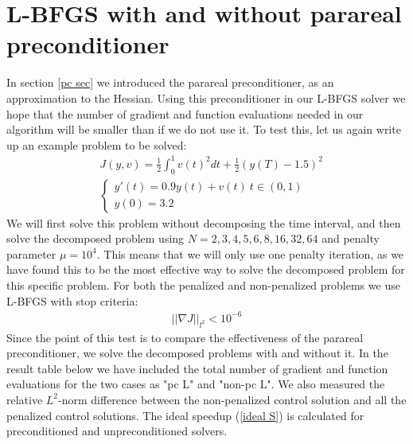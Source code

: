 \section{L-BFGS with and without parareal preconditioner}
In section \ref{pc sec} we introduced the parareal preconditioner, as an approximation to the Hessian. Using this preconditioner in our L-BFGS solver we hope that the number of gradient and function evaluations needed in our algorithm will be smaller than if we do not use it. To test this, let us again write up an example problem to be solved:
\begin{align*}
&J(y,v) = \frac{1}{2}\int_0^1v(t)^2dt + \frac{1}{2}(y(T)-1.5)^2 \\
&\left\{
     \begin{array}{lr}
       	y'(t)=0.9y(t) + v(t) \ t\in(0,1)\\
       	y(0)=3.2
     \end{array}
   \right. 
\end{align*}
We will first solve this problem without decomposing the time interval, and then solve the decomposed problem using $N=2,3,4,5,6,8,16,32,64$ and penalty parameter $\mu=10^4$. This means that we will only use one penalty iteration, as we have found this to be the most effective way to solve the decomposed problem for this specific problem. For both the penalized and non-penalized problems we use L-BFGS with stop criteria:
\begin{align*}
||\nabla J||_{l^2} <10^{-6}
\end{align*}  
Since the point of this test is to compare the effectiveness of the parareal preconditioner, we solve the decomposed problems with and without it. In the result table below we have included the total number of gradient and function evaluations for the two cases as "pc L" and "non-pc L". We also measured the relative $L^2$-norm difference between the non-penalized control solution and all the penalized control solutions. The ideal speedup (\ref{ideal S}) is calculated for preconditioned and unpreconditioned solvers.
\\
\\
